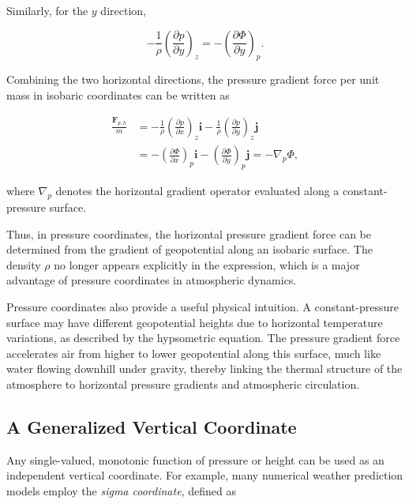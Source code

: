 \documentclass[10pt,twocolumn]{memoir}
\begin{document}
Similarly, for the $y$ direction,

\begin{equation}
    -\frac{1}{\rho}\left(\frac{\partial p}{\partial y}\right)_z
    =-\left(\frac{\partial\Phi}{\partial y}\right)_p.
\label{eq:c1_pgf_pressure_y}
\end{equation}

Combining the two horizontal directions, the pressure gradient force per unit mass in isobaric coordinates can be written as

\begin{equation}
\begin{aligned}
    \frac{\mathbf{F}_{p,h}}{m}
    &=-\frac{1}{\rho}\left(\frac{\partial p}{\partial x}\right)_z\mathbf{i} - \frac{1}{\rho}\left(\frac{\partial p}{\partial y}\right)_z\mathbf{j}\\
    &=-\left(\frac{\partial\Phi}{\partial x}\right)_p\mathbf{i}
    -\left(\frac{\partial\Phi}{\partial y}\right)_p\mathbf{j}
    =-\nabla_p\Phi,
\label{eq:c1_pgf_isobaric}
\end{aligned}
\end{equation}

where $\nabla_p$ denotes the horizontal gradient operator evaluated along a constant-pressure surface.

Thus, in pressure coordinates, the horizontal pressure gradient force can be determined from the gradient of geopotential along an isobaric surface. The density $\rho$ no longer appears explicitly in the expression, which is a major advantage of pressure coordinates in atmospheric dynamics.

Pressure coordinates also provide a useful physical intuition. A constant-pressure surface may have different geopotential heights due to horizontal temperature variations, as described by the hypsometric equation. The pressure gradient force accelerates air from higher to lower geopotential along this surface, much like water flowing downhill under gravity, thereby linking the thermal structure of the atmosphere to horizontal pressure gradients and atmospheric circulation.

\subsection{A Generalized Vertical Coordinate}

Any single-valued, monotonic function of pressure or height can be used as an independent vertical coordinate. For example, many numerical weather prediction models employ the \textit{sigma coordinate}, defined as
\end{document}
